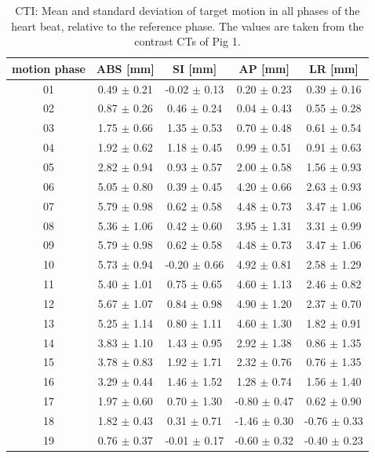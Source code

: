 \documentclass[type=dr, dr=rernat, accentcolor=tud7b,colorbacktitle, bigchapter, openright, twoside, 12pt ]{tudthesis}
\begin{document}
\newpage

\begin{table}[htbp]
  \centering
  \caption{CTI: Mean and standard deviation of target motion in all phases of the heart beat, relative to the reference phase. The values are 
  taken from the contrast CTs of Pig 1.}
  \begin{tabular}{|c|c|c|c|c|}
    \hline\hline
    motion phase\rule{0pt}{2.6ex}\rule[-1.2ex]{0pt}{0pt} & ABS [mm] & SI [mm] & AP [mm] & LR [mm]\\
    \hline
01 &0.49 $\pm$ 0.21 &-0.02 $\pm$ 0.13 &0.20 $\pm$ 0.23 &0.39 $\pm$ 0.16 \\
02 &0.87 $\pm$ 0.26 &0.46 $\pm$ 0.24 &0.04 $\pm$ 0.43 &0.55 $\pm$ 0.28 \\
03 &1.75 $\pm$ 0.66 &1.35 $\pm$ 0.53 &0.70 $\pm$ 0.48 &0.61 $\pm$ 0.54 \\
04 &1.92 $\pm$ 0.62 &1.18 $\pm$ 0.45 &0.99 $\pm$ 0.51 &0.91 $\pm$ 0.63 \\
05 &2.82 $\pm$ 0.94 &0.93 $\pm$ 0.57 &2.00 $\pm$ 0.58 &1.56 $\pm$ 0.93 \\
06 &5.05 $\pm$ 0.80 &0.39 $\pm$ 0.45 &4.20 $\pm$ 0.66 &2.63 $\pm$ 0.93 \\
07 &5.79 $\pm$ 0.98 &0.62 $\pm$ 0.58 &4.48 $\pm$ 0.73 &3.47 $\pm$ 1.06 \\
08 &5.36 $\pm$ 1.06 &0.42 $\pm$ 0.60 &3.95 $\pm$ 1.31 &3.31 $\pm$ 0.99 \\
09 &5.79 $\pm$ 0.98 &0.62 $\pm$ 0.58 &4.48 $\pm$ 0.73 &3.47 $\pm$ 1.06 \\
10 &5.73 $\pm$ 0.94 &-0.20 $\pm$ 0.66 &4.92 $\pm$ 0.81 &2.58 $\pm$ 1.29 \\
11 &5.40 $\pm$ 1.01 &0.75 $\pm$ 0.65 &4.60 $\pm$ 1.13 &2.46 $\pm$ 0.82 \\
12 &5.67 $\pm$ 1.07 &0.84 $\pm$ 0.98 &4.90 $\pm$ 1.20 &2.37 $\pm$ 0.70 \\
13 &5.25 $\pm$ 1.14 &0.80 $\pm$ 1.11 &4.60 $\pm$ 1.30 &1.82 $\pm$ 0.91 \\
14 &3.83 $\pm$ 1.10 &1.43 $\pm$ 0.95 &2.92 $\pm$ 1.38 &0.86 $\pm$ 1.35 \\
15 &3.78 $\pm$ 0.83 &1.92 $\pm$ 1.71 &2.32 $\pm$ 0.76 &0.76 $\pm$ 1.35 \\
16 &3.29 $\pm$ 0.44 &1.46 $\pm$ 1.52 &1.28 $\pm$ 0.74 &1.56 $\pm$ 1.40 \\
17 &1.97 $\pm$ 0.60 &0.70 $\pm$ 1.30 &-0.80 $\pm$ 0.47 &0.62 $\pm$ 0.90 \\
18 &1.82 $\pm$ 0.43 &0.31 $\pm$ 0.71 &-1.46 $\pm$ 0.30 &-0.76 $\pm$ 0.33 \\
19 &0.76 $\pm$ 0.37 &-0.01 $\pm$ 0.17 &-0.60 $\pm$ 0.32 &-0.40 $\pm$ 0.23 \\
    \hline\hline
  \end{tabular}
  \label{tab:motion:CTI:Pig1}
\end{table}
\end{document}
